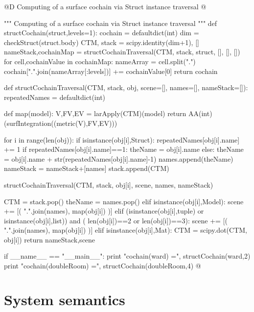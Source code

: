\documentclass[11pt,oneside]{article}    %
\begin{document}
@D Computing of a surface cochain via Struct instance traversal
@{""" Computing of a surface cochain via Struct instance traversal """
def structCochain(struct,levels=1):
    cochain = defaultdict(int)
    dim = checkStruct(struct.body)
    CTM, stack = scipy.identity(dim+1), []
    nameStack,cochainMap = structCochainTraversal(CTM, stack, struct, [], [], []) 
    for cell,cochainValue in cochainMap:
        nameArray = cell.split(".")
        cochain[".".join(nameArray[:levels])] += cochainValue[0]
    return cochain

def structCochainTraversal(CTM, stack, obj, scene=[], names=[], nameStack=[]):
    repeatedNames = defaultdict(int)
    
    def map(model):
        V,FV,EV = larApply(CTM)(model)
        return AA(int)(surfIntegration((metric(V),FV,EV)))
    
    for i in range(len(obj)):
        if isinstance(obj[i],Struct):
            repeatedNames[obj[i].name] += 1
            if repeatedNames[obj[i].name]==1: theName = obj[i].name
            else: theName = obj[i].name + str(repeatedNames[obj[i].name]-1)
            names.append(theName)
            nameStack = nameStack+[names]
            stack.append(CTM) 
            
            structCochainTraversal(CTM, stack, obj[i], scene, names, nameStack)
            
            CTM = stack.pop()
            theName = names.pop()
        elif isinstance(obj[i],Model): 
            scene += [( ".".join(names), map(obj[i]) )]
        elif (isinstance(obj[i],tuple) or isinstance(obj[i],list)) and (
              len(obj[i])==2 or len(obj[i])==3):
            scene += [( ".".join(names), map(obj[i]) )]
        elif isinstance(obj[i],Mat): 
            CTM = scipy.dot(CTM, obj[i])
    return nameStack,scene

if __name__ == "__main__":
    print "\nsurface cochain(ward) =", structCochain(ward,2)
    print "\nsurface cochain(doubleRoom) =", structCochain(doubleRoom,4)
@}


\section{System semantics}
\end{document}
